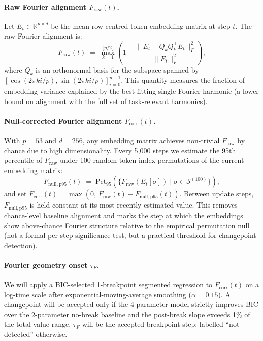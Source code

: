 \documentclass[12pt,openany,a4paper]{book}
\newcommand{\tauf}{\tau_{F}}
\newcommand{\fcorr}{F_{\mathrm{corr}}}
\begin{document}
\paragraph{Raw Fourier alignment $F_{\mathrm{raw}}(t)$.}
Let $E_t \in \mathbb{R}^{p \times d}$ be the mean-row-centred token
embedding matrix at step $t$.
The raw Fourier alignment is:
\begin{equation}
  F_{\mathrm{raw}}(t) \;=\;
  \max_{k=1}^{\lfloor p/2\rfloor}
  \!\left(1 - \frac{\|E_t - Q_k Q_k^\top E_t\|_F^2}
  {\|E_t\|_F^2}\right),
  \label{eq:f_raw}
\end{equation}
where $Q_k$ is an orthonormal basis for the subspace spanned by
$[\cos(2\pi k i/p),\sin(2\pi k i/p)]_{i=0}^{p-1}$.
This quantity measures the fraction of embedding variance explained
by the best-fitting single Fourier harmonic (a lower bound on
alignment with the full set of task-relevant harmonics).

\paragraph{Null-corrected Fourier alignment $\fcorr(t)$.}
With $p=53$ and $d=256$, any embedding matrix achieves non-trivial
$F_{\mathrm{raw}}$ by chance due to high dimensionality.
Every 5{,}000 steps we estimate the 95th percentile of
$F_{\mathrm{raw}}$ under 100 random token-index permutations of the
current embedding matrix:
\begin{equation}
  F_{\mathrm{null,p95}}(t) \;=\;
  \mathrm{Pct}_{95}\!\left(
    \{F_{\mathrm{raw}}(E_t[\sigma]) \mid \sigma \in \mathcal{S}^{(100)}\}
  \right),
\end{equation}
and set $\fcorr(t) = \max(0,\, F_{\mathrm{raw}}(t) - F_{\mathrm{null,p95}}(t))$.
Between update steps, $F_{\mathrm{null,p95}}$ is held constant at its
most recently estimated value.
This removes chance-level baseline alignment and marks the step at
which the embeddings show above-chance Fourier structure relative to
the empirical permutation null (not a formal per-step significance
test, but a practical threshold for changepoint detection).

\paragraph{Fourier geometry onset $\tauf$.}
We will apply a BIC-selected 1-breakpoint segmented regression to
$\fcorr(t)$ on a log-time scale after exponential-moving-average
smoothing ($\alpha = 0.15$).
A changepoint will be accepted only if the 4-parameter model strictly
improves BIC over the 2-parameter no-break baseline and the
post-break slope exceeds 1\% of the total value range.
$\tauf$ will be the accepted breakpoint step; labelled ``not detected''
otherwise.
\end{document}
